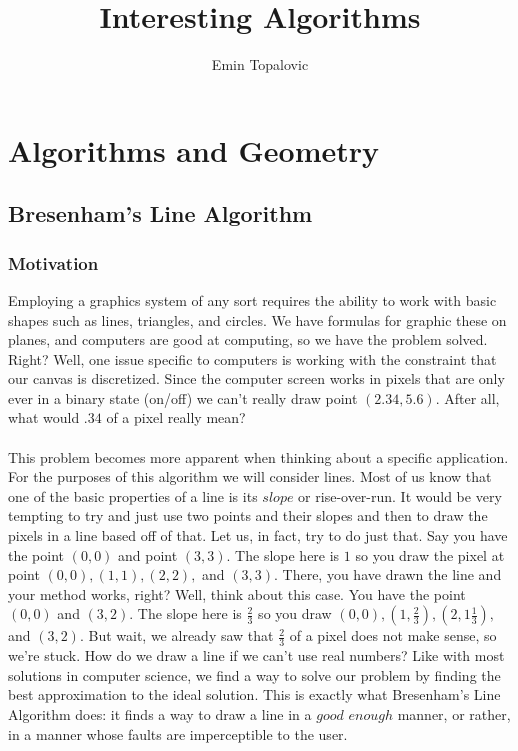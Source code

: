 \documentclass[10pt,a4paper,titlepage]{book}
\author{Emin Topalovic}
\title{Interesting Algorithms}
\begin{document}
\maketitle
{}

\section{Algorithms and Geometry}
\subsection{Bresenham's Line Algorithm}
\subsubsection{Motivation}
Employing a graphics system of any sort requires the ability to work with basic shapes such as lines, triangles, and circles. We have formulas for graphic these on planes, and computers are good at computing, so we have the problem solved. Right? Well, one issue specific to computers is working with the constraint that our canvas is discretized. Since the computer screen works in pixels that are only ever in a binary state (on/off) we can't really draw point $(2.34, 5.6)$. After all, what would $.34$ of a pixel really mean? \\\\

This problem becomes more apparent when thinking about a specific application. For the purposes of this algorithm we will consider lines. Most of us know that one of the basic properties of a line is its $slope$ or rise-over-run. It would be very tempting to try and just use two points and their slopes and then to draw the pixels in a line based off of that. Let us, in fact, try to do just that. Say you have the point $(0,0)$ and point $(3,3)$. The slope here is $1$ so you draw the pixel at point $(0,0), (1,1), (2,2),$ and $(3,3)$. There, you have drawn the line and your method works, right? Well, think about this case. You have the point $(0,0)$ and $(3,2)$. The slope here is $\frac{2}{3}$ so you draw $(0,0), (1,\frac{2}{3}), (2, 1\frac{1}{3}),$ and $(3, 2)$. But wait, we already saw that $\frac{2}{3}$ of a pixel does not make sense, so we're stuck. How do we draw a line if we can't use real numbers? Like with most solutions in computer science, we find a way to solve our problem by finding the best approximation to the ideal solution. This is exactly what Bresenham's Line Algorithm does: it finds a way to draw a line in a $good$ $enough$ manner, or rather, in a manner whose faults are imperceptible to the user.       
\end{document}
